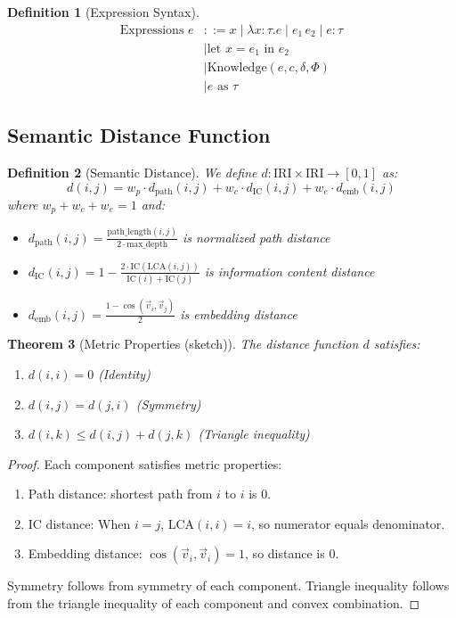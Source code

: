 \documentclass{article}
\newtheorem{theorem}{Theorem}[section]
\newtheorem{definition}[theorem]{Definition}
\begin{document}
\begin{definition}[Expression Syntax]
\begin{align*}
\text{Expressions } e &::= x \mid \lambda x:\tau. e \mid e_1 \, e_2 \mid e : \tau \\
                      &\mid \text{let } x = e_1 \text{ in } e_2 \\
                      &\mid \text{Knowledge}(e, c, \delta, \Phi) \\
                      &\mid e \text{ as } \tau
\end{align*}
\end{definition}

\subsection{Semantic Distance Function}

\begin{definition}[Semantic Distance]
We define $d : \text{IRI} \times \text{IRI} \to [0, 1]$ as:
\[
d(i, j) = w_p \cdot d_{\text{path}}(i, j) + w_c \cdot d_{\text{IC}}(i, j) + w_e \cdot d_{\text{emb}}(i, j)
\]
where $w_p + w_c + w_e = 1$ and:
\begin{itemize}
\item $d_{\text{path}}(i, j) = \frac{\text{path\_length}(i, j)}{2 \cdot \text{max\_depth}}$ is normalized path distance
\item $d_{\text{IC}}(i, j) = 1 - \frac{2 \cdot \text{IC}(\text{LCA}(i,j))}{\text{IC}(i) + \text{IC}(j)}$ is information content distance
\item $d_{\text{emb}}(i, j) = \frac{1 - \cos(\vec{v}_i, \vec{v}_j)}{2}$ is embedding distance
\end{itemize}
\end{definition}

\begin{theorem}[Metric Properties (sketch)]
The distance function $d$ satisfies:
\begin{enumerate}
\item $d(i, i) = 0$ \hfill (Identity)
\item $d(i, j) = d(j, i)$ \hfill (Symmetry)
\item $d(i, k) \leq d(i, j) + d(j, k)$ \hfill (Triangle inequality)
\end{enumerate}
\end{theorem}

\begin{proof}
Each component satisfies metric properties:
\begin{enumerate}
\item Path distance: shortest path from $i$ to $i$ is 0.
\item IC distance: When $i = j$, LCA$(i,i) = i$, so numerator equals denominator.
\item Embedding distance: $\cos(\vec{v}_i, \vec{v}_i) = 1$, so distance is 0.
\end{enumerate}
Symmetry follows from symmetry of each component. Triangle inequality follows
from the triangle inequality of each component and convex combination.
\end{proof}
\end{document}

